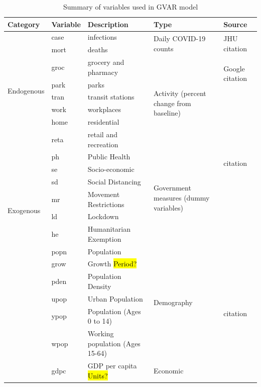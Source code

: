 \documentclass[preprint, 11pt]{elsarticle}
\newcommand{\?}{\stackrel{?}{=}}
\begin{document}
\begin{table}[h!]
  \caption{Summary of variables used in GVAR model}
  \label{tab:variables}
  \footnotesize
  \centering
  \begin{tabular}{l l l l l}\toprule
    \textbf{Category} &  \textbf{Variable} & \textbf{Description}  & \textbf{Type} &  \textbf{Source}\\\midrule
    \multirow{8}{.8in}{Endogenous}
  & case     & infections            & \multirow{2}{1in}{Daily COVID-19 counts} & \multirow{2}{1in}{JHU citation}  \\
  & mort     & deaths                &  & \\\cmidrule{2-5}
  & groc     & grocery and pharmacy  & \multirow{6}{1in}{Activity (percent change from baseline)} &   \multirow{2}{1in}{Google citation}  \\
  & park     & parks                 & & \\
  & tran     & transit stations      & &  \\
  & work     & workplaces            & &  \\
  & home     & residential           & &           \\
  & reta     & retail and recreation & &           \\\midrule
\multirow{8}{.8in}{Exogenous}
  & ph       & Public Health         & \multirow{6}{1in}{Government measures (dummy variables)} & \multirow{2}{1in}{citation} \\
  & se       & Socio-economic        & \\
  & sd       & Social Distancing     & \\
  & mr	     & Movement Restrictions & \\
  & ld       & Lockdown              & \\	
  & he       & Humanitarian Exemption  & \\  \midrule
\multirow{7}{.8in}{Deterministic}
  & popn	     & Population                & \multirow{6}{1in}{Demography} & \multirow{7}{1in}{citation}\\   
  & grow     & Growth \hl{Period?}			 & &\\
  & pden     & Population Density        &&	\\
  & upop     & Urban Population		      && \\
  & ypop     & Population (Ages 0 to 14)      &&  \\
  & wpop     & Working population (Ages 15-64)&& \\\cmidrule{2-5}
  & gdpc     & GDP per capita \hl{Units?}   & Economic & \\
  \bottomrule
\end{tabular}
\end{table}
\end{document}

